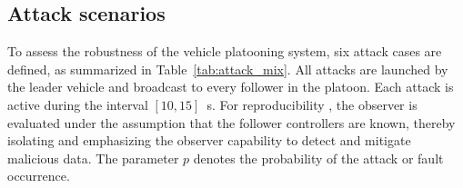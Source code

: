 \documentclass{ifacconf}
\begin{document}


\vspace*{-0.2cm}
\subsection{Attack scenarios}\label{sec:attack_scenarios}
\vspace*{-0.2cm}
To assess the robustness of the vehicle platooning system, six attack cases are defined, as summarized in Table~\ref{tab:attack_mix}. All attacks are launched by the leader vehicle and broadcast to every follower in the platoon. Each attack is active during the interval $[10, 15]$~s. For reproducibility
, the observer is evaluated under the assumption that the follower controllers are known, thereby isolating and emphasizing the observer capability to detect and mitigate malicious data. The parameter $p$ denotes the probability of the attack or fault occurrence.
\end{document}
